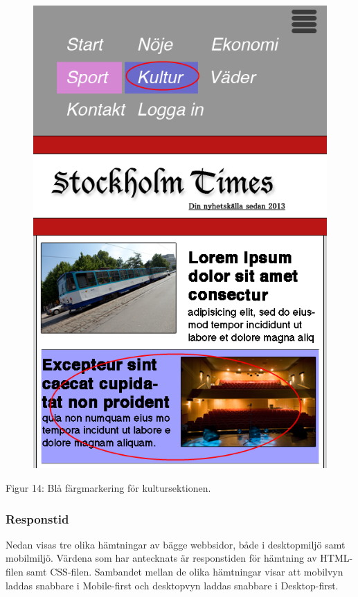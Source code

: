 \documentclass[11pt]{article}
\begin{document}
\begin{figure}[H]
{\includegraphics[scale=0.3]{pics/fargmobil.png}%
}
\end{figure}
\hspace{0.5cm}Figur 14: Blå färgmarkering för kultursektionen.


\subsubsection{Responstid}

Nedan visas tre olika hämtningar av bägge webbsidor, både i desktopmiljö samt mobilmiljö. Värdena som har antecknats är responstiden för hämtning av HTML-filen samt CSS-filen. Sambandet mellan de olika hämtningar visar att mobilvyn laddas snabbare i Mobile-first och desktopvyn laddas snabbare i Desktop-first.
\end{document}
